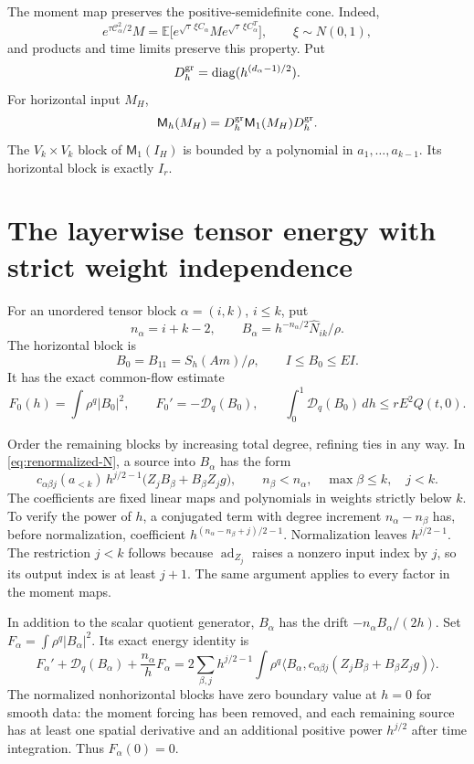 \documentclass[11pt,a4paper]{amsart}
\numberwithin{equation}{section}
\theoremstyle{remark}\newtheorem{remark}[theorem]{Remark}
\newcommand{\ad}{\operatorname{ad}}
\newcommand{\cD}{\mathcal D}
\newcommand{\cC}{\mathcal C}
\newcommand{\Mom}{\mathsf M}
\newcommand{\ip}[2]{\langle #1,#2\rangle}
\newcommand{\dd}{\,d}
\begin{document}
The moment map preserves the positive-semidefinite cone. Indeed,
\[
 e^{\tau\cC_\alpha^2/2}M
 =\mathbb E\big[e^{\sqrt\tau\,\xi C_\alpha}M
                     e^{\sqrt\tau\,\xi C_\alpha^T}\big],
 \qquad \xi\sim N(0,1),
\]
and products and time limits preserve this property. Put
\[
 D_h^{\rm gr}=\operatorname{diag}(h^{(d_\alpha-1)/2}).
\]
For horizontal input $M_H$,
\begin{equation}\label{eq:moment-scaling}
 \Mom_h(M_H)=D_h^{\rm gr}\Mom_1(M_H)D_h^{\rm gr}.
\end{equation}
The $V_k\times V_k$ block of $\Mom_1(I_H)$ is bounded by a polynomial in
$a_1,\ldots,a_{k-1}$. Its horizontal block is exactly $I_r$.

\section{The layerwise tensor energy with strict weight independence}
For an unordered tensor block $\alpha=(i,k)$, $i\le k$, put
\[
 n_\alpha=i+k-2,\qquad
 B_\alpha=h^{-n_\alpha/2}\widehat N_{ik}/\rho.
\]
The horizontal block is
\[
 B_0=B_{11}=S_h(Am)/\rho,\qquad I\le B_0\le EI.
\]
It has the exact common-flow estimate
\begin{equation}\label{eq:base-F}
 F_0(h)=\int\rho^q|B_0|^2,\qquad F_0'=-\cD_q(B_0),\qquad
 \int_0^1\cD_q(B_0)\dd h\le rE^2Q(t,0).
\end{equation}

Order the remaining blocks by increasing total degree, refining ties in any
way. In \eqref{eq:renormalized-N}, a source into $B_\alpha$ has the form
\begin{equation}\label{eq:block-source}
 c_{\alpha\beta j}(a_{<k})\,h^{j/2-1}
       \big(Z_jB_\beta+B_\beta Z_jg\big),
 \qquad n_\beta<n_\alpha,\quad\max\beta\le k,\quad j<k.
\end{equation}
The coefficients are fixed linear maps and polynomials in weights strictly
below $k$. To verify the power of $h$, a conjugated term with degree increment
$n_\alpha-n_\beta$ has, before normalization, coefficient
$h^{(n_\alpha-n_\beta+j)/2-1}$. Normalization leaves $h^{j/2-1}$.
The restriction $j<k$ follows because $\ad_{Z_j}$ raises a nonzero input
index by $j$, so its output index is at least $j+1$. The same argument applies
to every factor in the moment maps.

In addition to the scalar quotient generator, $B_\alpha$ has the drift
$-n_\alpha B_\alpha/(2h)$. Set $F_\alpha=\int\rho^q|B_\alpha|^2$.
Its exact energy identity is
\begin{equation}\label{eq:block-energy}
 F_\alpha'+\cD_q(B_\alpha)+\frac{n_\alpha}{h}F_\alpha
 =2\sum_{\beta,j}h^{j/2-1}\int\rho^q
  \ip{B_\alpha}{c_{\alpha\beta j}(Z_jB_\beta+B_\beta Z_jg)}.
\end{equation}
The normalized nonhorizontal blocks have zero boundary value at $h=0$ for
smooth data: the moment forcing has been removed, and each remaining source
has at least one spatial derivative and an additional positive power
$h^{j/2}$ after time integration. Thus $F_\alpha(0)=0$.
\end{document}
